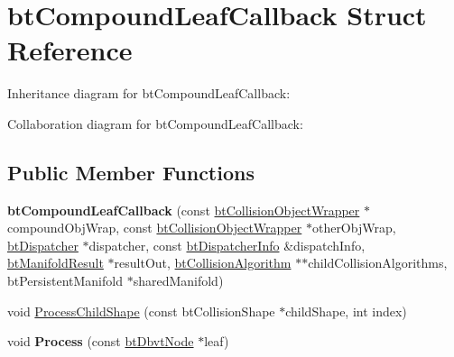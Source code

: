 \hypertarget{structbt_compound_leaf_callback}{\section{bt\+Compound\+Leaf\+Callback Struct Reference}
\label{structbt_compound_leaf_callback}
}


Inheritance diagram for bt\+Compound\+Leaf\+Callback\+:


Collaboration diagram for bt\+Compound\+Leaf\+Callback\+:
\subsection*{Public Member Functions}
\begin{DoxyCompactItemize}
\item 
\hypertarget{structbt_compound_leaf_callback_aa12b6d730ae8eb238fb42696c542e891}{{\bfseries bt\+Compound\+Leaf\+Callback} (const \hyperlink{structbt_collision_object_wrapper}{bt\+Collision\+Object\+Wrapper} $\ast$compound\+Obj\+Wrap, const \hyperlink{structbt_collision_object_wrapper}{bt\+Collision\+Object\+Wrapper} $\ast$other\+Obj\+Wrap, \hyperlink{classbt_dispatcher}{bt\+Dispatcher} $\ast$dispatcher, const \hyperlink{structbt_dispatcher_info}{bt\+Dispatcher\+Info} \&dispatch\+Info, \hyperlink{classbt_manifold_result}{bt\+Manifold\+Result} $\ast$result\+Out, \hyperlink{classbt_collision_algorithm}{bt\+Collision\+Algorithm} $\ast$$\ast$child\+Collision\+Algorithms, bt\+Persistent\+Manifold $\ast$shared\+Manifold)}\label{structbt_compound_leaf_callback_aa12b6d730ae8eb238fb42696c542e891}

\item 
void \hyperlink{structbt_compound_leaf_callback_a447295638bb470ddfbcdd314eb14b6ad}{Process\+Child\+Shape} (const bt\+Collision\+Shape $\ast$child\+Shape, int index)
\item 
\hypertarget{structbt_compound_leaf_callback_aec8c0611c31835fac977d230701a71d5}{void {\bfseries Process} (const \hyperlink{structbt_dbvt_node}{bt\+Dbvt\+Node} $\ast$leaf)}\label{structbt_compound_leaf_callback_aec8c0611c31835fac977d230701a71d5}

\end{DoxyCompactItemize}

